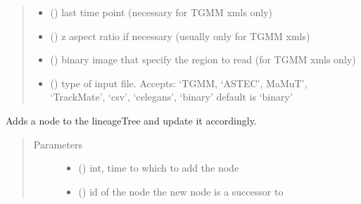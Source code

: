 \documentclass[letterpaper,10pt,english]{sphinxmanual}
\begin{document}
\begin{fulllineitems}
\begin{fulllineitems}
\begin{quote}
\begin{description}
\begin{itemize}
\item {} 
 () \textendash{} last time point (necessary for TGMM xmls only)

\item {} 
 () \textendash{} z aspect ratio if necessary (usually only for TGMM xmls)

\item {} 
 () \textendash{} binary image that specify the region to read (for TGMM xmls only)

\item {} 
 () \textendash{} type of input file. Accepts:
‘TGMM, ‘ASTEC’, MaMuT’, ‘TrackMate’, ‘csv’, ‘celegans’, ‘binary’
default is ‘binary’

\end{itemize}

\end{description}\end{quote}

\end{fulllineitems}


\begin{fulllineitems}
\label{\detokenize{index:LineageTree.lineageTree.add_node}}
Adds a node to the lineageTree and update it accordingly.
\begin{quote}\begin{description}
\item[{Parameters}] \leavevmode\begin{itemize}
\item {} 
 () \textendash{} int, time to which to add the node

\item {} 
 () \textendash{} id of the node the new node is a successor to


\end{itemize}
\end{description}
\end{quote}
\end{fulllineitems}
\end{fulllineitems}
\end{document}
